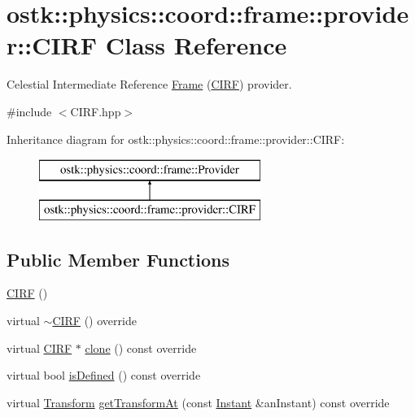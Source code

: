 \hypertarget{classostk_1_1physics_1_1coord_1_1frame_1_1provider_1_1_c_i_r_f}{}\section{ostk\+:\+:physics\+:\+:coord\+:\+:frame\+:\+:provider\+:\+:C\+I\+RF Class Reference}
\label{classostk_1_1physics_1_1coord_1_1frame_1_1provider_1_1_c_i_r_f}


Celestial Intermediate Reference \hyperlink{classostk_1_1physics_1_1coord_1_1_frame}{Frame} (\hyperlink{classostk_1_1physics_1_1coord_1_1frame_1_1provider_1_1_c_i_r_f}{C\+I\+RF}) provider.  




{\ttfamily \#include $<$C\+I\+R\+F.\+hpp$>$}

Inheritance diagram for ostk\+:\+:physics\+:\+:coord\+:\+:frame\+:\+:provider\+:\+:C\+I\+RF\+:\begin{figure}[H]
\begin{center}
\leavevmode
\includegraphics[height=2.000000cm]{classostk_1_1physics_1_1coord_1_1frame_1_1provider_1_1_c_i_r_f}
\end{center}
\end{figure}
\subsection*{Public Member Functions}
\begin{DoxyCompactItemize}
\item 
\hyperlink{classostk_1_1physics_1_1coord_1_1frame_1_1provider_1_1_c_i_r_f_ae7331c8b1396a6ba64833232eeded44d}{C\+I\+RF} ()
\item 
virtual \hyperlink{classostk_1_1physics_1_1coord_1_1frame_1_1provider_1_1_c_i_r_f_aba9f49808bea3b91c88a5d08f4330218}{$\sim$\+C\+I\+RF} () override
\item 
virtual \hyperlink{classostk_1_1physics_1_1coord_1_1frame_1_1provider_1_1_c_i_r_f}{C\+I\+RF} $\ast$ \hyperlink{classostk_1_1physics_1_1coord_1_1frame_1_1provider_1_1_c_i_r_f_a9c7c1e79785b676501e6a4686389a425}{clone} () const override
\item 
virtual bool \hyperlink{classostk_1_1physics_1_1coord_1_1frame_1_1provider_1_1_c_i_r_f_affec3924a864a0d793ee5aa887a06cf8}{is\+Defined} () const override
\item 
virtual \hyperlink{classostk_1_1physics_1_1coord_1_1_transform}{Transform} \hyperlink{classostk_1_1physics_1_1coord_1_1frame_1_1provider_1_1_c_i_r_f_a9a9cdbec164d2f54cfdaa2a1a62c3250}{get\+Transform\+At} (const \hyperlink{classostk_1_1physics_1_1time_1_1_instant}{Instant} \&an\+Instant) const override
\end{DoxyCompactItemize}


